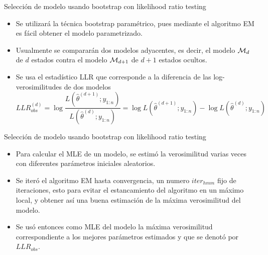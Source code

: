 \begin{frame}{Selección de modelo usando bootstrap con likelihood ratio testing}
  \begin{itemize} 
    \itemsep1em

    \item Se utilizará la técnica bootstrap paramétrico, pues mediante el algoritmo EM es fácil obtener el modelo parametrizado. 

    \item Usualmente se compararán dos modelos adyacentes, es decir, el modelo $\mathcal{M}_d$ de $d$ estados contra el modelo $\mathcal{M}_{d+1}$ de $d+1$ estados ocultos.

    \item Se usa el estadístico LLR que corresponde a la diferencia de las log-verosimilitudes de dos modelos
      \begin{equation}
        LLR^{(d)}_{obs} = \log \frac{L(\hat \theta^{(d+1)}; y_{1:n})}{L(\hat \theta^{(d)}; y_{1:n})} =
          \log L(\hat \theta^{(d+1)}; y_{1:n}) - 
          \log L(\hat \theta^{(d)}; y_{1:n})
      \end{equation}
  \end{itemize}
\end{frame}

\begin{frame}{Selección de modelo usando bootstrap con likelihood ratio testing}
  \begin{itemize} 
    \itemsep1em
    \item Para calcular el MLE de un modelo, se estimó la verosimilitud varias veces con diferentes parámetros iniciales aleatorios. 

    \item Se iteró el algoritmo EM hasta convergencia, un numero $iter_{hmm}$ fijo de iteraciones, esto para evitar el estancamiento del algoritmo en un máximo local, y obtener así una buena estimación de la máxima verosimilitud del modelo.

    \item Se usó entonces como MLE del modelo la máxima verosimilitud correspondiente a los mejores parámetros estimados y que se denotó por $LLR_{obs}$.
  \end{itemize}
\end{frame}
